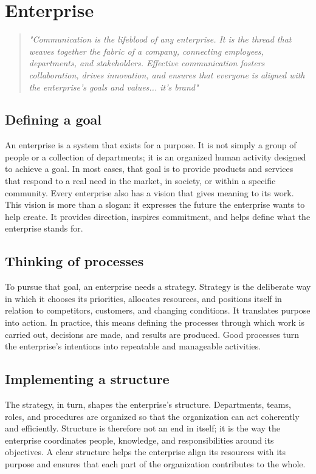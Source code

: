 \chapter{Enterprise}
\label{chap:enterprise}

\begin{quote}
\textit{"Communication is the lifeblood of any enterprise. It is the thread that weaves together the fabric of a company, connecting employees, departments, and stakeholders. Effective communication fosters collaboration, drives innovation, and ensures that everyone is aligned with the enterprise's goals and values... it's brand"}
\end{quote}

\section{Defining a goal}

An enterprise is a system that exists for a purpose. It is not simply a group of people or a collection of departments; it is an organized human activity designed to achieve a goal. In most cases, that goal is to provide products and services that respond to a real need in the market, in society, or within a specific community. Every enterprise also has a vision that gives meaning to its work. This vision is more than a slogan: it expresses the future the enterprise wants to help create. It provides direction, inspires commitment, and helps define what the enterprise stands for.

\section{Thinking of processes}

To pursue that goal, an enterprise needs a strategy. Strategy is the deliberate way in which it chooses its priorities, allocates resources, and positions itself in relation to competitors, customers, and changing conditions. It translates purpose into action. In practice, this means defining the processes through which work is carried out, decisions are made, and results are produced. Good processes turn the enterprise's intentions into repeatable and manageable activities.

\section{Implementing a structure}

The strategy, in turn, shapes the enterprise's structure. Departments, teams, roles, and procedures are organized so that the organization can act coherently and efficiently. Structure is therefore not an end in itself; it is the way the enterprise coordinates people, knowledge, and responsibilities around its objectives. A clear structure helps the enterprise align its resources with its purpose and ensures that each part of the organization contributes to the whole.

